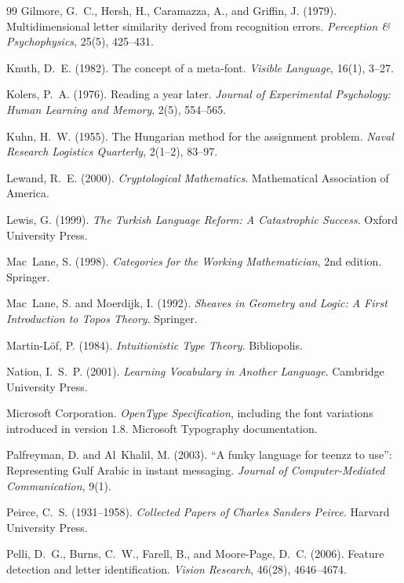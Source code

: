 \begin{thebibliography}{99}
Gilmore, G.~C., Hersh, H., Caramazza, A., and Griffin, J. (1979). Multidimensional letter similarity derived from recognition errors. \emph{Perception \& Psychophysics}, 25(5), 425--431.

Knuth, D.~E. (1982). The concept of a meta-font. \emph{Visible Language}, 16(1), 3--27.

Kolers, P.~A. (1976). Reading a year later. \emph{Journal of Experimental Psychology: Human Learning and Memory}, 2(5), 554--565.

Kuhn, H.~W. (1955). The Hungarian method for the assignment problem. \emph{Naval Research Logistics Quarterly}, 2(1--2), 83--97.

Lewand, R.~E. (2000). \emph{Cryptological Mathematics}. Mathematical Association of America.

Lewis, G. (1999). \emph{The Turkish Language Reform: A Catastrophic Success}. Oxford University Press.

Mac~Lane, S. (1998). \emph{Categories for the Working Mathematician}, 2nd edition. Springer.

Mac~Lane, S. and Moerdijk, I. (1992). \emph{Sheaves in Geometry and Logic: A First Introduction to Topos Theory}. Springer.

Martin-L\"of, P. (1984). \emph{Intuitionistic Type Theory}. Bibliopolis.

Nation, I.~S.~P. (2001). \emph{Learning Vocabulary in Another Language}. Cambridge University Press.

Microsoft Corporation. \emph{OpenType Specification}, including the font variations introduced in version 1.8. Microsoft Typography documentation.

Palfreyman, D. and Al~Khalil, M. (2003). ``A funky language for teenzz to use'': Representing Gulf Arabic in instant messaging. \emph{Journal of Computer-Mediated Communication}, 9(1).

Peirce, C.~S. (1931--1958). \emph{Collected Papers of Charles Sanders Peirce}. Harvard University Press.

Pelli, D.~G., Burns, C.~W., Farell, B., and Moore-Page, D.~C. (2006). Feature detection and letter identification. \emph{Vision Research}, 46(28), 4646--4674.


\end{thebibliography}
